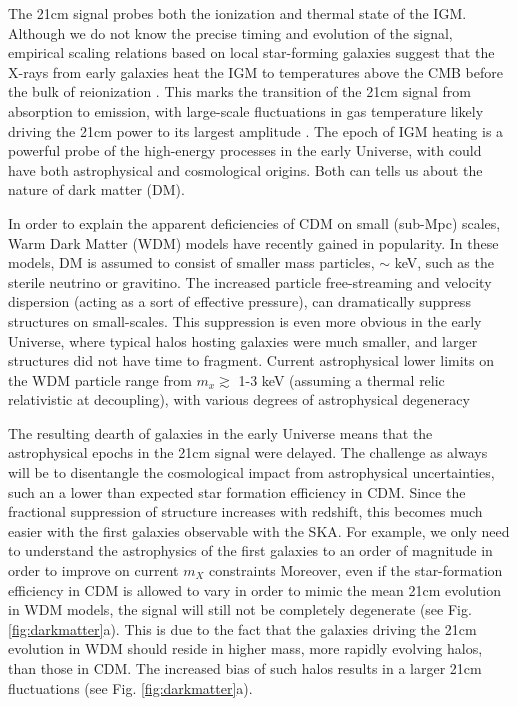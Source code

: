\documentclass{PoS}
\begin{document}
The 21cm signal probes both the ionization and thermal state of the IGM.  Although we do not know the precise timing and evolution of the signal, empirical scaling relations based on local star-forming galaxies \cite[e.g.][]{2012MNRAS.419.2095M} suggest that the X-rays from early galaxies heat the IGM to temperatures above the CMB before the bulk of reionization \cite[e.g.][]{2006MNRAS.371..867F,2012ApJ...760....3M}.  This marks the transition of the 21cm signal from absorption to emission, with large-scale fluctuations in gas temperature likely driving the 21cm power to its largest amplitude \cite[e.g.][]{2007MNRAS.376.1680P,2010A&A...523A...4B}.  The epoch of IGM heating is a powerful probe of the high-energy processes in the early Universe, with could have both astrophysical and cosmological origins.  Both can tells us about the nature of dark matter (DM).

In order to explain the apparent deficiencies of CDM on small (sub-Mpc) scales, Warm Dark Matter (WDM) models have recently gained in popularity.  In these models, DM is assumed to consist of smaller mass particles, $\sim$ keV, such as the sterile neutrino or gravitino.  The increased particle free-streaming and velocity dispersion (acting as a sort of effective pressure), can dramatically suppress structures on small-scales.  This suppression is even more obvious in the early Universe, where typical halos hosting galaxies were much smaller, and larger structures did not have time to fragment.  Current astrophysical lower limits on the WDM particle range from $m_x \gtrsim$ 1-3 keV (assuming a thermal relic relativistic at decoupling), with various degrees of astrophysical degeneracy \cite[e.g.][]{2013MNRAS.432.3218D,2013ApJ...767...22K,2014MNRAS.443..678P,2013PhRvD..88d3502V}

The resulting dearth of galaxies in the early Universe means that the astrophysical epochs in the 21cm signal were delayed.  The challenge as always will be to disentangle the cosmological impact from astrophysical uncertainties, such an a lower than expected star formation efficiency in CDM.  Since the fractional suppression of structure increases with redshift, this becomes much easier with the first galaxies observable with the SKA.  For example, we only need to understand the astrophysics of the first galaxies to an order of magnitude in order to improve on current $m_X$ constraints \citep{2014MNRAS.438.2664S}
Moreover, even if the star-formation efficiency in CDM is allowed to vary in order to mimic the mean 21cm evolution in WDM models, the signal will still not be completely degenerate (see Fig. \ref{fig:darkmatter}a).  This is due to the fact that the galaxies driving the 21cm evolution in WDM should reside in higher mass, more rapidly evolving halos, than those in CDM.  The increased bias of such halos results in a larger 21cm fluctuations (see Fig. \ref{fig:darkmatter}a).
\end{document}
